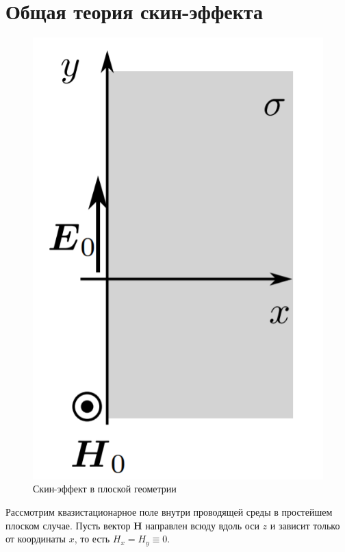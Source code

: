 \documentclass[a4paper, 12pt]{article} %
\begin{document}
\section{Общая теория скин-эффекта}
\begin{figure}
		\vspace{-20pt}
		\begin{center}
			\includegraphics[height=0.2\textheight]{Skin1.png}
		\end{center}
		\vspace{-20pt}
		\caption{Скин-эффект в плоской геометрии}
		\vspace{20pt}
	\end{figure}

	Рассмотрим квазистационарное поле внутри проводящей среды в простейшем плоском случае. Пусть вектор $\boldsymbol{H}$ направлен всюду вдоль оси $z$ и зависит только от координаты $x$, то есть $H_x = H_y \equiv 0$.
	
\end{document}
